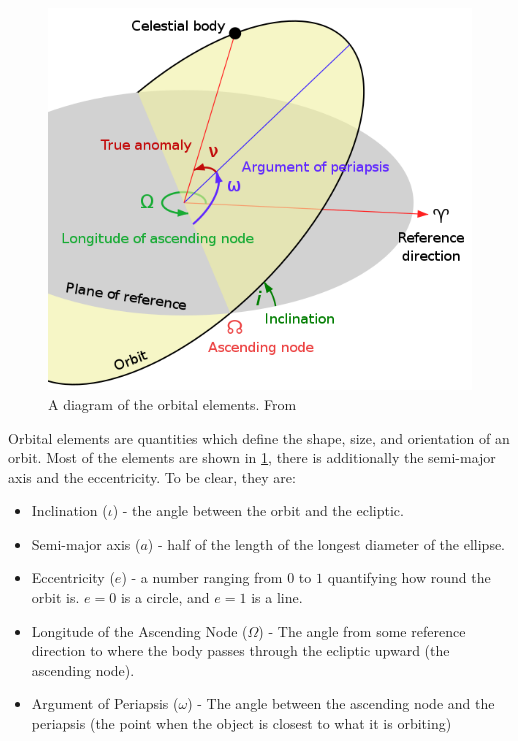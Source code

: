 \documentclass[a4paper,12pt]{article} %
\numberwithin{equation}{section} %
\numberwithin{figure}{section} %
\begin{document}
\begin{figure}[h!]
  \centering
  \includegraphics[scale=0.4]{OrbitalElements.png}
  \caption{A diagram of the orbital elements. From \cite{orbital_elements}}
  \label{fig:orbital_elements}
\end{figure}

Orbital elements are quantities which define the shape, size, and orientation of an orbit. Most of the elements are shown in \ref{fig:orbital_elements}, there is additionally the semi-major axis and the eccentricity. To be clear, they are:

\begin{itemize}
  \item Inclination ($\iota$) - the angle between the orbit and the ecliptic.
  \item Semi-major axis ($a$) - half of the length of the longest diameter of the ellipse.
  \item Eccentricity ($e$) - a number ranging from $0$ to $1$ quantifying how round the orbit is. $e=0$ is a circle, and $e=1$ is a line.
  \item Longitude of the Ascending Node ($\Omega$) - The angle from some reference direction to where the body passes through the ecliptic upward (the ascending node).
  \item Argument of Periapsis ($\omega$) - The angle between the ascending node and the periapsis (the point when the object is closest to what it is orbiting)
\end{itemize}
\end{document}
